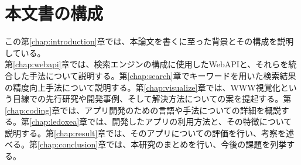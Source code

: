 \section{本文書の構成}
この第\ref{chap:introduction}章では、本論文を書くに至った背景とその構成を説明している。\\
第\ref{chap:webapi}章では、検索エンジンの構成に使用したWebAPIと、それらを統合した手法について説明する。第\ref{chap:search}章でキーワードを用いた検索結果の精度向上手法について説明する。第\ref{chap:visualize}章では、WWW視覚化という目線での先行研究や開発事例、そして解決方法についての案を提起する。第\ref{chap:coding}章では、アプリ開発のための言語や手法についての詳細を概説する。第\ref{chap:ledoxea}章では、開発したアプリの利用方法と、その特徴について説明する。第\ref{chap:result}章では、そのアプリについての評価を行い、考察を述べる。第\ref{chap:conclusion}章では、本研究のまとめを行い、今後の課題を列挙する。